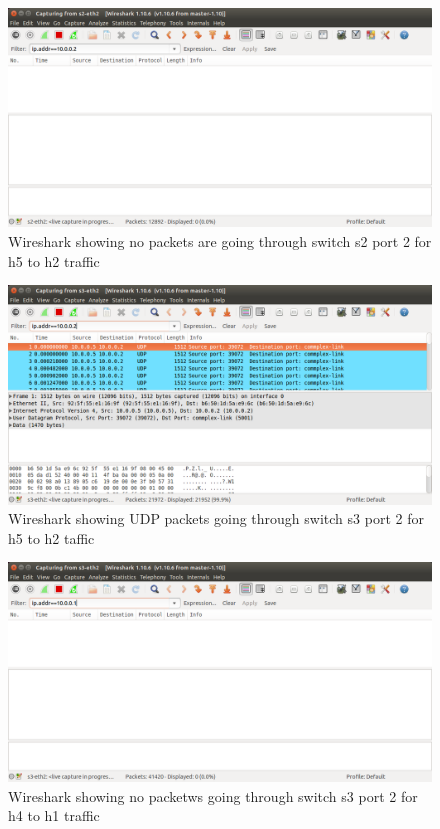 \begin{figure}[h!]
 \centering
 \includegraphics[width=\linewidth]{images/loadbalancing/s2fromh2.png}
 \caption{Wireshark showing no packets are going through switch s2 port 2 for h5 to h2 traffic}
 \label{fig:s2fromh2}
\end{figure}

\begin{figure}[h!]
 \centering
 \includegraphics[width=\linewidth]{images/loadbalancing/s3fromh2.png}
 \caption{Wireshark showing UDP packets going through switch s3 port 2 for h5 to h2 taffic}
 \label{fig:s3fromh2}
\end{figure}

\begin{figure}[h!]
 \centering
 \includegraphics[width=\linewidth]{images/loadbalancing/s3fromh1.png}
 \caption{Wireshark showing no packetws going through switch s3 port 2 for h4 to h1 traffic}
 \label{fig:s3fromh1}
\end{figure}